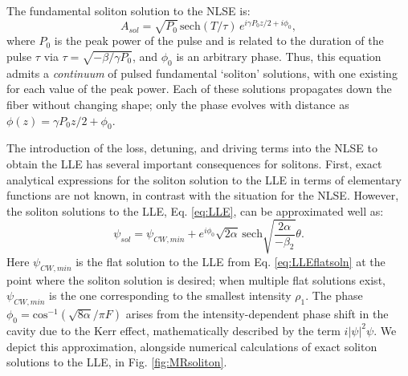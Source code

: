 The fundamental soliton solution to the NLSE is:
\begin{equation}
A_{sol}=\sqrt{P_0}\, \mathrm{sech}\left(T/\tau\right)\,e^{i\gamma P_0 z/2+i\phi_0},
\end{equation}
where $P_0$ is the peak power of the pulse and is related to the duration of the pulse $\tau$ via $\tau=\sqrt{-\beta/\gamma P_0}$, and $\phi_0$ is an arbitrary phase. Thus, this equation admits a \textit{continuum} of pulsed fundamental `soliton' solutions, with one existing for each value of the peak power. Each of these solutions propagates down the fiber without changing shape; only the phase evolves with distance as $\phi(z)=\gamma P_0 z/2+\phi_0$.


The introduction of the loss, detuning, and driving terms into the NLSE to obtain the LLE has several important consequences for solitons. First, exact analytical expressions for the soliton solution to the LLE in terms of elementary functions are not known, in contrast with the situation for the NLSE. However, the soliton solutions to the LLE, Eq. \ref{eq:LLE}, can be approximated well as:
\begin{equation}
\psi_{sol}=\psi_{CW,min}+e^{i\phi_0}\sqrt{2\alpha}\,\mathrm{sech}\sqrt{\frac{2\alpha}{-\beta_2}}\theta. \label{eq:LLEsoliton}
\end{equation}
Here $\psi_{CW,min}$ is the flat solution to the LLE from Eq. \ref{eq:LLEflatsoln} at the point where the soliton solution is desired; when multiple flat solutions exist, $\psi_{CW,min}$ is the one corresponding to the smallest intensity $\rho_1$. The phase $\phi_0=\mathrm{cos}^{-1}(\sqrt{8\alpha}/\pi F)$ arises from the intensity-dependent phase shift in the cavity due to the Kerr effect, mathematically described by the term $i|\psi|^2\psi$. We depict this approximation, alongside numerical calculations of exact soliton solutions to the LLE, in Fig. \ref{fig:MRsoliton}.



